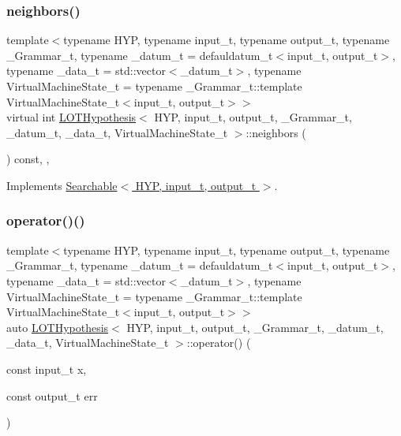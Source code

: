 \subsubsection{\texorpdfstring{neighbors()}{neighbors()}}
{\footnotesize\ttfamily template$<$typename H\+YP, typename input\+\_\+t, typename output\+\_\+t, typename \+\_\+\+Grammar\+\_\+t, typename \+\_\+datum\+\_\+t = defauldatum\+\_\+t$<$input\+\_\+t, output\+\_\+t$>$, typename \+\_\+data\+\_\+t = std\+::vector$<$\+\_\+datum\+\_\+t$>$, typename Virtual\+Machine\+State\+\_\+t = typename \+\_\+\+Grammar\+\_\+t\+::template Virtual\+Machine\+State\+\_\+t$<$input\+\_\+t, output\+\_\+t$>$$>$ \\
virtual int \hyperlink{class_l_o_t_hypothesis}{L\+O\+T\+Hypothesis}$<$ H\+YP, input\+\_\+t, output\+\_\+t, \+\_\+\+Grammar\+\_\+t, \+\_\+datum\+\_\+t, \+\_\+data\+\_\+t, Virtual\+Machine\+State\+\_\+t $>$\+::neighbors (\begin{DoxyParamCaption}{ }\end{DoxyParamCaption}) const\hspace{0.3cm}{\ttfamily [inline]}, {\ttfamily [override]}, {\ttfamily [virtual]}}



Implements \hyperlink{class_searchable_aec30063fcc9bed5d005f8318efa8492d}{Searchable$<$ H\+Y\+P, input\+\_\+t, output\+\_\+t $>$}.

\mbox{\label{class_l_o_t_hypothesis_a7275626861140284ee08512fd0641ce1}} 
\subsubsection{\texorpdfstring{operator()()}{operator()()}}
{\footnotesize\ttfamily template$<$typename H\+YP, typename input\+\_\+t, typename output\+\_\+t, typename \+\_\+\+Grammar\+\_\+t, typename \+\_\+datum\+\_\+t = defauldatum\+\_\+t$<$input\+\_\+t, output\+\_\+t$>$, typename \+\_\+data\+\_\+t = std\+::vector$<$\+\_\+datum\+\_\+t$>$, typename Virtual\+Machine\+State\+\_\+t = typename \+\_\+\+Grammar\+\_\+t\+::template Virtual\+Machine\+State\+\_\+t$<$input\+\_\+t, output\+\_\+t$>$$>$ \\
auto \hyperlink{class_l_o_t_hypothesis}{L\+O\+T\+Hypothesis}$<$ H\+YP, input\+\_\+t, output\+\_\+t, \+\_\+\+Grammar\+\_\+t, \+\_\+datum\+\_\+t, \+\_\+data\+\_\+t, Virtual\+Machine\+State\+\_\+t $>$\+::operator() (\begin{DoxyParamCaption}\item[{const input\+\_\+t}]{x,  }\item[{const output\+\_\+t}]{err }\end{DoxyParamCaption})\hspace{0.3cm}{\ttfamily [inline]}}

